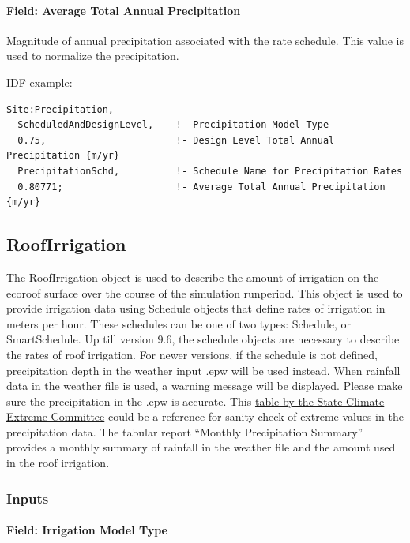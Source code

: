 \paragraph{Field: Average Total Annual Precipitation}\label{field-average-total-annual-precipitation}

Magnitude of annual precipitation associated with the rate schedule. This value is used to normalize the precipitation.

IDF example:

\begin{lstlisting}
Site:Precipitation,
  ScheduledAndDesignLevel,    !- Precipitation Model Type
  0.75,                       !- Design Level Total Annual Precipitation {m/yr}
  PrecipitationSchd,          !- Schedule Name for Precipitation Rates
  0.80771;                    !- Average Total Annual Precipitation {m/yr}
\end{lstlisting}

\subsection{RoofIrrigation}\label{roofirrigation}

The RoofIrrigation object is used to describe the amount of irrigation on the
ecoroof surface over the course of the simulation runperiod. This object is used
to provide irrigation data using Schedule objects that define rates of
irrigation in meters per hour. These schedules can be one of two types:
Schedule, or SmartSchedule. Up till version 9.6, the schedule objects are
necessary to describe the rates of roof irrigation. For newer versions, if the
schedule is not defined, precipitation depth in the weather input .epw will be
used instead. When rainfall data in the weather file is used, a
warning message will be displayed. Please make sure the precipitation in the
.epw is accurate. This \href{https://www.ncdc.noaa.gov/extremes/scec/records/all/maxp}{table by the State Climate Extreme
Committee} could be a
reference for sanity check of extreme values in the precipitation data. The
tabular report ``Monthly Precipitation Summary'' provides a monthly summary of
rainfall in the weather file and the amount used in the roof irrigation.

\subsubsection{Inputs}\label{inputs-23-002}

\paragraph{Field: Irrigation Model Type}\label{field-irrigation-model-type}

